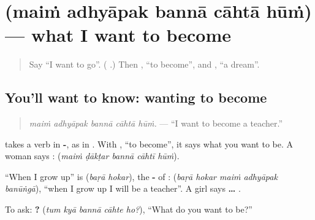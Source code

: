\section[\texorpdfstring{\hi{मैं} \hi{अध्यापक} \hi{बनना} … (maiṁ adhyāpak …)}{मैं अध्यापक बनना … (maiṁ adhyāpak …)}]{     (maiṁ adhyāpak bannā cāhtā hūṁ) — what I want to become}

\label{lesson:HI-C284-bannachahta}



\begin{quote}
Say \textquotedblleft{}I want to go\textquotedblright{}. (\textbf{   }.) Then \textbf{}, \textquotedblleft{}to become\textquotedblright{}, and \textbf{}, \textquotedblleft{}a dream\textquotedblright{}.
\end{quote}

\subsection*{You'll want to know: wanting to become}
\begin{quote}
\textbf{    }
\end{quote}

\begin{quote}
\emph{maiṁ adhyāpak bannā cāhtā hūṁ.} — \textquotedblleft{}I want to become a teacher.\textquotedblright{}
\end{quote}

\textbf{} takes a verb in \textbf{-}, as in \textbf{   }. With \textbf{}, \textquotedblleft{}to become\textquotedblright{}, it says what you want to be. A woman says \textbf{ }: \textbf{    } (\emph{maiṁ ḍākṭar bannā cāhtī hūṁ}).

\textquotedblleft{}When I grow up\textquotedblright{} is \textbf{ } (\emph{baṛā hokar}), the \textbf{-} of \textbf{}: \textbf{    } (\emph{baṛā hokar maiṁ adhyāpak banūṅgā}), \textquotedblleft{}when I grow up I will be a teacher\textquotedblright{}. A girl says \textbf{  … }.

To ask: \textbf{    ?} (\emph{tum kyā bannā cāhte ho?}), \textquotedblleft{}What do you want to be?\textquotedblright{}

